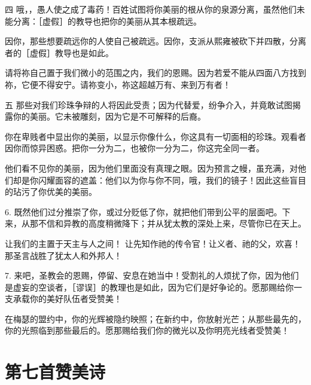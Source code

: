四 哦，，愚人使之成了毒药！百姓试图将你美丽的根从你的泉源分离，虽然他们未能分离：［虚假］的教导也把你的美丽从其本根疏远。\par

因你，那些想要疏远你的人使自己被疏远。因你，支派从熙雍被砍下并四散，分离者的［虚假］教导也是如此。\par

请将祢自己置于我们微小的范围之内，我们的恩赐。因为若爱不能从四面八方找到祢，它便不得安宁。请祢变小，祢这超越万有、来到万有者！\par

五 那些对我们珍珠争辩的人将因此受责；因为代替爱，纷争介入，并竟敢试图揭露你的美丽。它未被雕刻，因为它是不可解释的后裔。\par

你在卑贱者中显出你的美丽，以显示你像什么，你这具有一切面相的珍珠。观看者因你而惊异困惑。把你一分为二，也被你一分为二，你这完全同一者。\par

他们看不见你的美丽，因为他们里面没有真理之眼。因为预言之幔，虽充满，对他们却是你闪耀面容的遮盖：他们以为你与你不同，哦，我们的镜子！因此这些盲目的玷污了你优美的美丽。\par

6. 既然他们过分推崇了你，或过分贬低了你，就把他们带到公平的层面吧。下来，从那不信和异教的高度稍微降下；并从犹太教的深处上来，尽管你已在天上。\par

让我们的主置于天主与人之间！ 让先知作祂的传令官！让义者、祂的父，欢喜！那圣言战胜了犹太人和外邦人！\par

7. 来吧，圣教会的恩赐，停留、安息在她当中！受割礼的人烦扰了你，因为他们是虚妄的空谈者，［谬误］的教理也是如此，因为它们是好争论的。愿那赐给你一支承载你的美好队伍者受赞美！\par

在梅瑟的盟约中，你的光辉被隐约映照；在新约中，你放射光芒；从那些最先的，你的光照临到那些最后的。愿那赐给我们你的微光以及你明亮光线者受赞美！\par


\section{第七首赞美诗}

